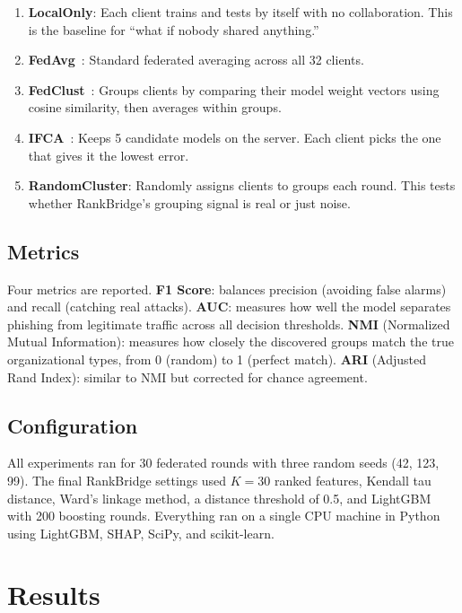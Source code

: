 \documentclass[12pt,a4paper]{article}
\begin{document}
\begin{enumerate}[leftmargin=*]
  \item \textbf{LocalOnly}: Each client trains and tests by itself with no collaboration. This is the baseline for ``what if nobody shared anything.''
  \item \textbf{FedAvg}~\cite{mcmahan2017communication}: Standard federated averaging across all 32 clients.
  \item \textbf{FedClust}~\cite{sattler2021cfl}: Groups clients by comparing their model weight vectors using cosine similarity, then averages within groups.
  \item \textbf{IFCA}~\cite{ghosh2020ifca}: Keeps 5 candidate models on the server. Each client picks the one that gives it the lowest error.
  \item \textbf{RandomCluster}: Randomly assigns clients to groups each round. This tests whether RankBridge's grouping signal is real or just noise.
\end{enumerate}

\subsection{Metrics}

Four metrics are reported. \textbf{F1 Score}: balances precision (avoiding false alarms) and recall (catching real attacks). \textbf{AUC}: measures how well the model separates phishing from legitimate traffic across all decision thresholds. \textbf{NMI} (Normalized Mutual Information): measures how closely the discovered groups match the true organizational types, from 0 (random) to 1 (perfect match). \textbf{ARI} (Adjusted Rand Index): similar to NMI but corrected for chance agreement.

\subsection{Configuration}

All experiments ran for 30 federated rounds with three random seeds (42, 123, 99). The final RankBridge settings used $K = 30$ ranked features, Kendall tau distance, Ward's linkage method, a distance threshold of 0.5, and LightGBM with 200 boosting rounds. Everything ran on a single CPU machine in Python using LightGBM, SHAP, SciPy, and scikit-learn.

\section{Results}\label{sec:results}
\end{document}
